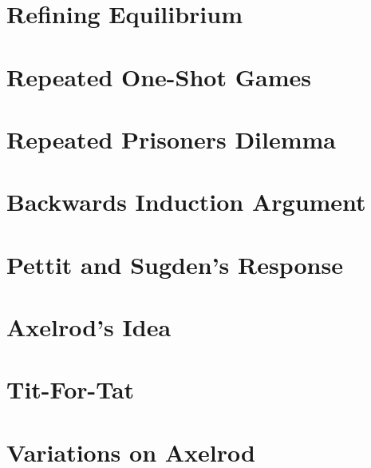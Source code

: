 \section{Refining Equilibrium}

\section{Repeated One-Shot Games}

\section{Repeated Prisoners Dilemma}

\section{Backwards Induction Argument}

\section{Pettit and Sugden's Response}

\section{Axelrod's Idea}

\section{Tit-For-Tat}

\section{Variations on Axelrod}


